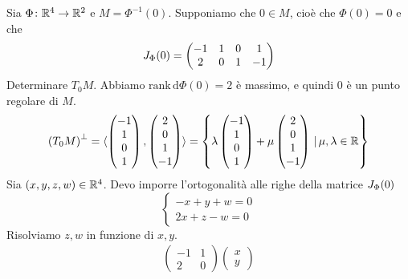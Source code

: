 \documentclass[a4paper]{article}
\begin{document}
\begin{snippetexample}{}
    Sia \(\Phi\colon \mathbb{R}^4 \to \mathbb{R}^2\) e \(M = \Phi^{-1}(0)\).
    Supponiamo che \(0\in M\), cioè che \(\Phi(0)=0\) e che
    \[
        J_\Phi(0) = \begin{pmatrix}
            -1 & 1 & 0 & 1 \\ 2 & 0 & 1 & -1
        \end{pmatrix}
    \]
    Determinare \(T_0 M\). Abbiamo \(\text{rank} \, \text{d} \Phi(0)=2\) è massimo,
    e quindi \(0\) è un punto regolare di \(M\).
    \[
        \left(T_0M\right)^\perp = \langle \begin{pmatrix}
            -1 \\ 1 \\ 0 \\ 1
        \end{pmatrix}, \begin{pmatrix}
            2 \\ 0 \\ 1 \\ -1
        \end{pmatrix}
        \rangle = \left\{
            \lambda \begin{pmatrix}
                -1 \\ 1 \\ 0 \\ 1
            \end{pmatrix}
            + \mu \begin{pmatrix}
                2 \\ 0 \\ 1 \\ -1
            \end{pmatrix}
            \,|\, \mu, \lambda \in \mathbb{R}
        \right\}
    \]
    Sia \((x,y,z,w) \in \mathbb{R}^4\). Devo imporre l'ortogonalità alle righe della matrice
    \(J_\Phi(0)\)
    \[
        \begin{cases}
            -x + y + w = 0 \\
            2x + z - w = 0
        \end{cases}
    \]
    Risolviamo \(z,w\) in funzione di \(x,y\).
    \begin{align*}
        \begin{pmatrix}
            -1 & 1 \\ 2 & 0
        \end{pmatrix}
        \begin{pmatrix}
            x \\ y

\end{pmatrix}
\end{align*}
\end{snippetexample}
\end{document}
